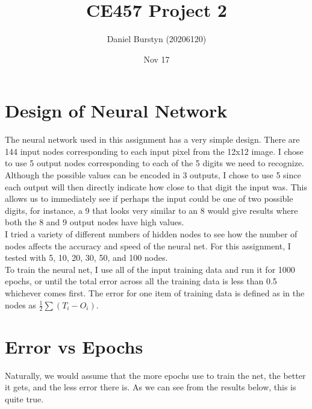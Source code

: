 \documentclass[12pt]{article}
\title{CE457 Project 2}
\author{Daniel Burstyn (20206120)}
\date{Nov 17}
\begin{document}
\maketitle
\newpage

\section{Design of Neural Network}
The neural network used in this assignment has a very simple design.  There are
144 input nodes corresponding to each input pixel from the 12x12 image.  I chose
to use 5 output nodes corresponding to each of the 5 digits we need to
recognize.  Although the possible values can be encoded in 3 outputs, I chose to
use 5 since each output will then directly indicate how close to that digit the
input was.  This allows us to immediately see if perhaps the input could be one
of two possible digits, for instance, a 9 that looks very similar to an 8 would
give results where both the 8 and 9 output nodes have high values.\\

I tried a variety of different numbers of hidden nodes to see how the number of
nodes affects the accuracy and speed of the neural net.  For this assignment, I
tested with 5, 10, 20, 30, 50, and 100 nodes.\\

To train the neural net, I use all of the input training data and run it for
1000 epochs, or until the total error across all the training data is less than
0.5 whichever comes first.  The error for one item of training data is defined
as in the nodes as $\frac{1}{2}\sum(T_i - O_i)$.\\

\section{Error vs Epochs}
Naturally, we would assume that the more epochs use to train the net, the better
it gets, and the less error there is.  As we can see from the results below,
this is quite true.\\
\end{document}
